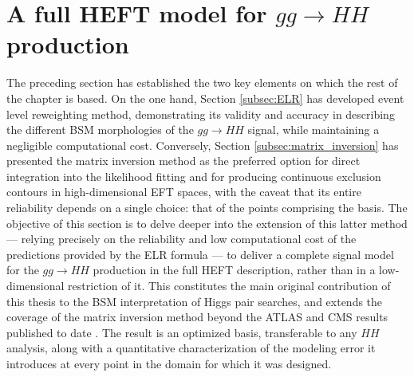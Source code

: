 \section{A full HEFT model for \texorpdfstring{$gg\to HH$}{gg → HH} production}
\label{sec:full_model}
The preceding section has established the two key elements on which the rest of the chapter is based. On the one hand, Section \ref{subsec:ELR} has developed event level reweighting method, demonstrating its validity and accuracy in describing the different BSM morphologies of the $gg\to HH$ signal, while maintaining a negligible computational cost. Conversely, Section \ref{subsec:matrix_inversion} has presented the matrix inversion method as the preferred option for direct integration into the likelihood fitting and for producing continuous exclusion contours in high-dimensional EFT spaces, with the caveat that its entire reliability depends on a single choice: that of the points comprising the basis. The objective of this section is to delve deeper into the extension of this latter method — relying precisely on the reliability and low computational cost of the predictions provided by the ELR formula — to deliver a complete signal model for the $gg\to HH$ production in the full HEFT description, rather than in a low-dimensional restriction of it. This constitutes the main original contribution of this thesis to the BSM interpretation of Higgs pair searches, and extends the coverage of the matrix inversion method beyond the ATLAS and CMS results published to date \cite{ATLAS:2025tkn,CMS_combination}. The result is an optimized basis, transferable to any $HH$ analysis, along with a quantitative characterization of the modeling error it introduces at every point in the domain for which it was designed.

